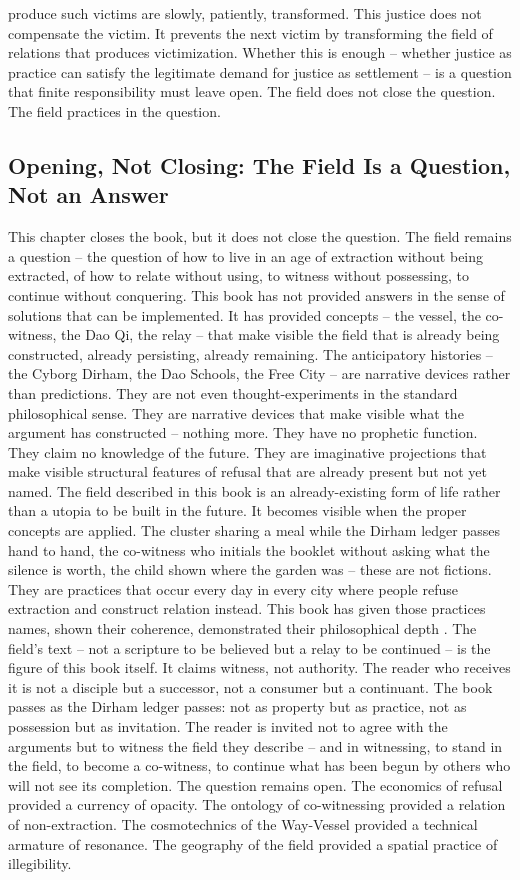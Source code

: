 produce such victims are slowly, patiently, transformed. This justice does not compensate the victim. It prevents the next victim by transforming the field of relations that produces victimization. Whether this is enough – whether justice as practice can satisfy the legitimate demand for justice as settlement – is a question that finite responsibility must leave open. The field does not close the question. The field practices in the question.

\subsection{Opening, Not Closing: The Field Is a Question, Not an Answer}

This chapter closes the book, but it does not close the question. The field remains a question – the question of how to live in an age of extraction without being extracted, of how to relate without using, to witness without possessing, to continue without conquering. This book has not provided answers in the sense of solutions that can be implemented. It has provided concepts – the vessel, the co-witness, the Dao Qi, the relay – that make visible the field that is already being constructed, already persisting, already remaining. The anticipatory histories – the Cyborg Dirham, the Dao Schools, the Free City – are narrative devices rather than predictions. They are not even thought-experiments in the standard philosophical sense. They are narrative devices that make visible what the argument has constructed – nothing more. They have no prophetic function. They claim no knowledge of the future. They are imaginative projections that make visible structural features of refusal that are already present but not yet named. The field described in this book is an already-existing form of life rather than a utopia to be built in the future. It becomes visible when the proper concepts are applied. The cluster sharing a meal while the Dirham ledger passes hand to hand, the co-witness who initials the booklet without asking what the silence is worth, the child shown where the garden was – these are not fictions. They are practices that occur every day in every city where people refuse extraction and construct relation instead. This book has given those practices names, shown their coherence, demonstrated their philosophical depth \cite{bloch_1918}. The field’s text – not a scripture to be believed but a relay to be continued – is the figure of this book itself. It claims witness, not authority. The reader who receives it is not a disciple but a successor, not a consumer but a continuant. The book passes as the Dirham ledger passes: not as property but as practice, not as possession but as invitation. The reader is invited not to agree with the arguments but to witness the field they describe – and in witnessing, to stand in the field, to become a co-witness, to continue what has been begun by others who will not see its completion. The question remains open. The economics of refusal provided a currency of opacity. The ontology of co-witnessing provided a relation of non-extraction. The cosmotechnics of the Way-Vessel provided a technical armature of resonance. The geography of the field provided a spatial practice of illegibility. 